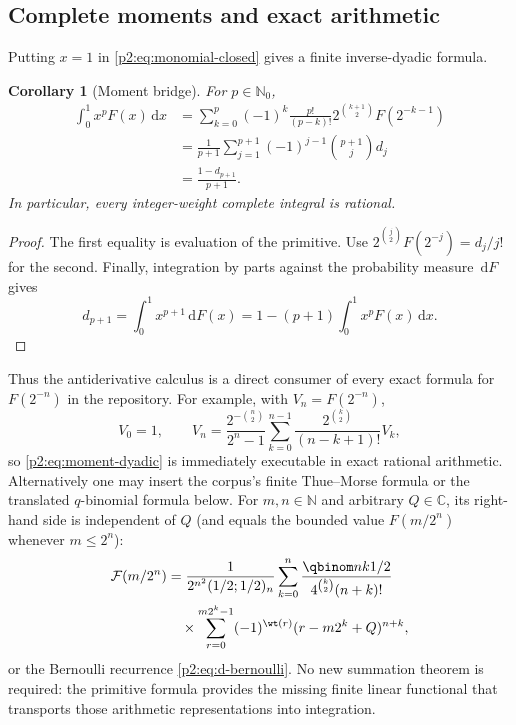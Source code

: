 \documentclass[11pt,oneside]{article}
\newtheorem{corollary}[theorem]{Corollary}
\theoremstyle{definition}
\theoremstyle{remark}
\newcommand{\C}{\mathbb C}
\newcommand{\N}{\mathbb N}
\newcommand{\dd}{\,\mathrm d}
\newcommand{\1}{\mathbf 1}
\begin{document}
\subsection{Complete moments and exact arithmetic}
Putting $x=1$ in \eqref{p2:eq:monomial-closed} gives a finite inverse-dyadic
formula.

\begin{corollary}[Moment bridge]
\label{p2:cor:moment-bridge}
For $p\in\N_0$,
\begin{align}
 \int_0^1x^pF(x)\dd x
 &=\sum_{k=0}^{p}(-1)^k\frac{p!}{(p-k)!}
 2^{\binom{k+1}{2}}F(2^{-k-1})                             \label{p2:eq:moment-dyadic}\\
 &=\frac1{p+1}\sum_{j=1}^{p+1}(-1)^{j-1}
   \binom{p+1}{j}d_j                                      \label{p2:eq:moment-d}\\
 &=\boxed{\frac{1-d_{p+1}}{p+1}}.                         \label{p2:eq:moment-prob}
\end{align}
In particular, every integer-weight complete integral is rational.
\end{corollary}

\begin{proof}
The first equality is evaluation of the primitive.  Use
$2^{\binom j2}F(2^{-j})=d_j/j!$ for the second.  Finally, integration by parts
against the probability measure $\dd F$ gives
\[
 d_{p+1}=\int_0^1x^{p+1}\dd F(x)
 =1-(p+1)\int_0^1x^pF(x)\dd x.
\]
\end{proof}

Thus the antiderivative calculus is a direct consumer of every exact formula
for $F(2^{-n})$ in the repository.  For example, with $V_n=F(2^{-n})$,
\begin{equation}
 V_0=1,\qquad
 V_n=\frac{2^{-\binom n2}}{2^n-1}
 \sum_{k=0}^{n-1}\frac{2^{\binom k2}}{(n-k+1)!}V_k,       \label{p2:eq:V-recurrence}
\end{equation}
so \eqref{p2:eq:moment-dyadic} is immediately executable in exact rational
arithmetic.  Alternatively one may insert the corpus's finite Thue--Morse
formula or the translated $q$-binomial formula below.  For
$m,n\in\N$ and arbitrary $Q\in\C$, its right-hand side is independent of
$Q$ (and equals the bounded value $F(m/2^n)$ whenever $m\le2^n$):
\begin{align}
 \mathcal F(m/2^n)
 &=\frac{1}{2^{n^2}(1/2;1/2)_n}
 \sum_{k=0}^{n}
 \frac{\qbinom nk{1/2}}{4^{\binom k2}(n+k)!}              \notag\\
 &\quad\times\sum_{r=0}^{m2^k-1}(-1)^{\wt(r)}
 (r-m2^k+Q)^{n+k},                                        \label{p2:eq:q-dyadic-import}
\end{align}
or the Bernoulli recurrence \eqref{p2:eq:d-bernoulli}.  No new summation theorem
is required: the primitive formula provides the missing finite linear
functional that transports those arithmetic representations into integration.
\end{document}
